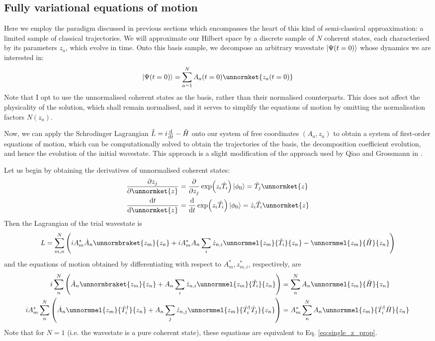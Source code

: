 \subsection{Fully variational equations of motion}
Here we employ the paradigm discussed in previous sections which encompasses the heart of this kind of semi-classical approaximation: a limited sample of classical trajectories. We will approximate our Hilbert space by a discrete sample of $N$ coherent states, each characterised by its parameters $z_a$, which evolve in time. Onto this basis sample, we decompose an arbitrary wavestate $\ket{\Psi(t=0)}$ whose dynamics we are interested in:
\begin{equation}
\ket{\Psi(t=0)}=\sum_{a=1}^N A_a(t=0)\unnormket{z_a(t=0)}
\end{equation}
Note that I opt to use the unnormalised coherent states as the basis, rather than their normalised counterparts. This does not affect the physicality of the solution, which shall remain normalised, and it serves to simplify the equations of motion by omitting the normalisation factors $N(z_a)$.

Now, we can apply the Schrodinger Lagrangian $\hat{L}=i\dv{t}-\hat{H}$ onto our system of free coordinates $(A_a, z_a)$ to obtain a system of first-order equations of motion, which can be computationally solved to obtain the trajectories of the basis, the decomposition coefficient evolution, and hence the evolution of the initial wavestate. This approach is a slight modification of the approach used by Qiao and Grossmann in \cite{grossmann}.

Let us begin by obtaining the derivatives of unnormalised coherent states:
\begin{align}
\pdv{z_j}\unnormket{z}&=\pdv{z_j}\exp(z_i\hat{T}_i)\ket{\phi_0}=\hat{T}_j\unnormket{z}\\
\dv{t}\unnormket{z}&=\dv{t}\exp(z_i\hat{T}_i)\ket{\phi_0}=\dot{z}_i\hat{T}_i\unnormket{z}
\end{align}
Then the Lagrangian of the trial wavestate is
\begin{align*}
L=\sum_{m,n}^N\left(iA_m^*\dot{A}_n\unnormbraket{z_m}{z_n}+iA_m^*A_n\sum_i \dot{z}_{n,i} \unnormmel{z_m}{\hat{T}_i}{z_n}-\unnormmel{z_m}{\hat{H}}{z_n}\right)
\end{align*}
and the equations of motion obtained by differentiating with respect to $A_m^*, z_{m,i}^*$, respectively, are
\begin{align}
i\sum_{n}^N \left(\dot{A}_n\unnormbraket{z_m}{z_n}+A_n\sum_i \dot{z}_{n,i}\unnormmel{z_m}{\hat{T}_i}{z_n} \right)&=\sum_{n}^N A_n\unnormmel{z_m}{\hat{H}}{z_n}\\
i A_m^*\sum_{n}^N \left(\dot{A}_n \unnormmel{z_m}{\hat{T}_i\hc}{z_n} + A_n \sum_j \dot{z}_{n,j} \unnormmel{z_m}{\hat{T}_i\hc \hat{T}_j}{z_n} \right) &= A_m^*\sum_{n}^N A_n\unnormmel{z_m}{\hat{T}_i\hc\hat{H}}{z_n}
\end{align}
Note that for $N=1$ (i.e. the wavestate is a pure coherent state), these equations are equivalent to Eq. \ref{eq:single_z_prop}.

